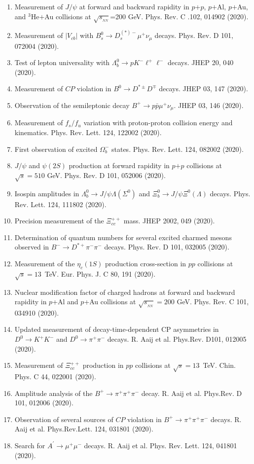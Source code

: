 \documentclass[11pt]{article}
\newcommand{\snn}{\sqrt{s_{_{NN}}}}
\begin{document}
\begin{flushleft}
\begin{center}
\begin{enumerate}
		\item Measurement of $J/\psi$ at forward and backward rapidity in $p$$+$$p$, $p$$+$Al, $p$$+$Au, and $^3$He$+$Au collisions at $\snn$=200 GeV. Phys. Rev. C .102, 014902 (2020).
		\item Measurement of $|V_{cb}|$ with $B_s^0\rightarrow D_s^{(*)-}\mu^+\nu_\mu$ decays. Phys. Rev. D 101, 072004 (2020).
	\item Test of lepton universality with $\Lambda_b^0\rightarrow pK^-\ell^+\ell^-$ decays. JHEP 20, 040 (2020).
			\item Measurement of $CP$ violation in $B^0\rightarrow D^{*\pm}D^\mp$ decays. JHEP 03, 147 (2020).
		\item Observation of the semileptonic decay $B^+\rightarrow p\bar{p}\mu^+\nu_{\mu}$. JHEP 03, 146 (2020).
		\item Measurement of $f_s/f_u$ variation with proton-proton collision energy and kinematics. Phys. Rev. Lett. 124, 122002 (2020).
		\item First observation of excited $\Omega_b^-$ states. Phys. Rev. Lett. 124, 082002 (2020).
		\item $J/\psi$ and $\psi(2S)$ production at forward rapidity in $p$$+$$p$ collisions at $\sqrt{s}=510$ GeV. Phys. Rev. D 101, 052006 (2020).
		\item Isospin amplitudes in $\Lambda_{b}^0\rightarrow J/\psi\Lambda(\Sigma^0)$ and $\Xi_b^0\rightarrow J/\psi\Xi^0(\Lambda)$ decays. Phys. Rev. Lett. 124, 111802 (2020).
	 	\item Precision measurement of the $\Xi_{cc}^{++}$ mass. JHEP 2002, 049 (2020).
		\item Determination of quantum numbers for several excited charmed mesons observed in $B^-\rightarrow D^{*+}\pi^-\pi^-$  decays. Phys. Rev. D 101, 032005 (2020).
		\item Measurement of the $\eta_c(1S)$ production cross-section in $pp$ collisions at $\sqrt{s}=13$~TeV. Eur. Phys. J. C 80, 191 (2020).
	    \item Nuclear modification factor of charged hadrons at forward and backward rapidity in $p$+Al and $p$+Au collisions at $\snn=200$ GeV. Phys. Rev. C 101, 034910 (2020).
		\item Updated measurement of decay-time-dependent CP asymmetries in $D^0\rightarrow K^+K^-$ and $D^0\rightarrow\pi^+\pi^-$ decays. R. Aaij et al. Phys.Rev. D101, 012005 (2020).
		\item Measurement of $\Xi_{cc}^{++}$ production in $pp$ collisions at $\sqrt{s} = 13$~TeV. Chin. Phys. C 44, 022001 (2020).
		\item Amplitude analysis of the $B^+\rightarrow\pi^+\pi^+\pi^-$ decay. R. Aaij et al. Phys.Rev. D 101, 012006 (2020).
		\item Observation of several sources of $CP$ violation in $B^+\rightarrow\pi^+\pi^+\pi^-$ decays. R. Aaij et al. Phys.Rev.Lett. 124, 031801 (2020).
		\item Search for $A^\prime\rightarrow\mu^+\mu^-$ decays. R. Aaij et al. Phys. Rev. Lett. 124, 041801 (2020).
	

\end{enumerate}
\end{center}
\end{flushleft}
\end{document}
